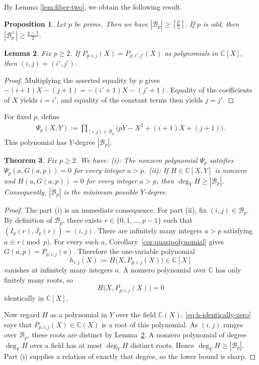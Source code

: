 \documentclass[reqno, 12pt]{article}
\numberwithin{equation}{section}
\newtheorem{theorem}{Theorem}[section]
\newtheorem{proposition}[theorem]{Proposition}
\newtheorem{lemma}[theorem]{Lemma}
\theoremstyle{definition}
\newcommand{\CC}{\mathbb{C}}
\newcommand{\cB}{\mathcal B}
\begin{document}
By Lemma \ref{lem:fiber-two}, we obtain the following result.
\begin{proposition}\label{prop:branch-count}
Let $p$ be prime. Then we have $|\cB_p|\ge\left\lceil\frac{p}{2}\right\rceil$.
If $p$ is odd, then $|\cB_p^{\times}|\ge\frac{p-1}{2}$.
\end{proposition}


\begin{lemma}\label{lem:distinct-polynomials}
Fix $p\ge2$. If $P_{p;i,j}(X)=P_{p;i',j'}(X)$ as polynomials in $\CC[X]$, then $(i,j)=(i',j')$.
\end{lemma}
\begin{proof}
Multiplying the asserted equality by $p$ gives $-(i+1)X-(j+1)=-(i'+1)X-(j'+1)$.
Equality of the coefficients of $X$ yields $i=i'$, and equality of the constant terms then yields $j=j'$.
\end{proof}

For fixed $p$, define
\begin{align*}
 \Psi_p(X,Y):=\prod_{(i,j)\in\cB_p}\bigl(pY-X^2+(i+1)X+(j+1)\bigr).
\end{align*}
This polynomial has $Y$-degree $|\cB_p|$.


\begin{theorem}\label{thm:fixed-p-degree}
Fix $p\ge2$. We have: (i): The nonzero polynomial $\Psi_p$ satisfies $\Psi_p(a,G(a,p))=0$ for every integer $a>p$.
(ii): If $H\in\CC[X,Y]$ is nonzero and $H(a,G(a,p))=0$ for every integer $a>p$, then $\deg_Y H\ge|\cB_p|$.
Consequently, $|\cB_p|$ is the minimum possible $Y$-degree.
\end{theorem}
\begin{proof}
The part (i) is an immediate consequence. For part (ii), fix $(i,j)\in\cB_p$.  By definition of $\cB_p$, there exists
$r\in\{0,1,\ldots,p-1\}$ such that $(I_p(r),J_p(r))=(i,j)$.
There are infinitely many integers $a>p$ satisfying $a\equiv r\pmod p$.
For every such $a$, Corollary~\ref{cor:quasipolynomial} gives $G(a,p)=P_{p;i,j}(a)$.
Therefore the one-variable polynomial
\[h_{i,j}(X):=H\bigl(X,P_{p;i,j}(X)\bigr)\in\CC[X]
\]
vanishes at infinitely many integers $a$.  A nonzero polynomial over $\CC$
has only finitely many roots, so
\begin{equation}\label{eq:h-identically-zero}
   H\bigl(X,P_{p;i,j}(X)\bigr)=0
\end{equation}
identically in $\CC[X]$.

Now regard $H$ as a polynomial in $Y$ over the field $\CC(X)$. \cref{eq:h-identically-zero} says that $P_{p;i,j}(X)\in\CC(X)$ is a root of this polynomial.  As $(i,j)$ ranges over $\cB_p$, these roots are distinct by
Lemma~\ref{lem:distinct-polynomials}.  A nonzero polynomial of degree
$\deg_YH$ over a field has at most $\deg_YH$ distinct roots.  Hence $\deg_YH\ge|\cB_p|$.  Part (i) supplies a relation of exactly
that degree, so the lower bound is sharp.
\end{proof}
\end{document}
